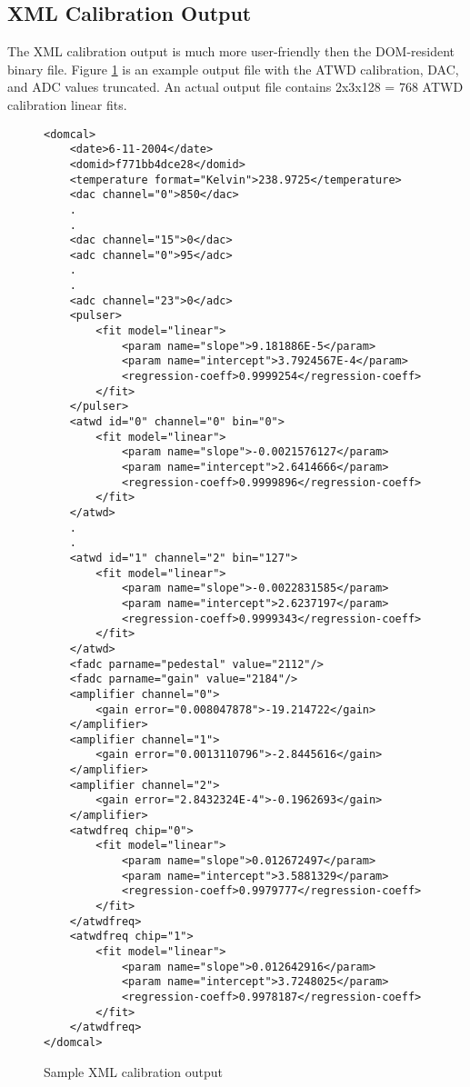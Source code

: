 \documentclass[10pt]{article}
\begin{document}
\subsection{XML Calibration Output}

The XML calibration output is much more user-friendly then the DOM-resident binary
file.  Figure \ref{fig:xml} is an example output file with the ATWD calibration,
DAC, and ADC values truncated.
An actual output file contains 2x3x128 = 768 ATWD calibration linear fits.

\begin{figure}
\begin{footnotesize}
\begin{verbatim}
<domcal>
    <date>6-11-2004</date>
    <domid>f771bb4dce28</domid>
    <temperature format="Kelvin">238.9725</temperature>
    <dac channel="0">850</dac>
    .
    .
    <dac channel="15">0</dac>
    <adc channel="0">95</adc>
    .
    .
    <adc channel="23">0</adc>
    <pulser>
        <fit model="linear">
            <param name="slope">9.181886E-5</param>
            <param name="intercept">3.7924567E-4</param>
            <regression-coeff>0.9999254</regression-coeff>
        </fit>
    </pulser>
    <atwd id="0" channel="0" bin="0">
        <fit model="linear">
            <param name="slope">-0.0021576127</param>
            <param name="intercept">2.6414666</param>
            <regression-coeff>0.9999896</regression-coeff>
        </fit>
    </atwd>
    .
    .
    <atwd id="1" channel="2" bin="127">
        <fit model="linear">
            <param name="slope">-0.0022831585</param>
            <param name="intercept">2.6237197</param>
            <regression-coeff>0.9999343</regression-coeff>
        </fit>
    </atwd>
    <fadc parname="pedestal" value="2112"/>
    <fadc parname="gain" value="2184"/>
    <amplifier channel="0">
        <gain error="0.008047878">-19.214722</gain>
    </amplifier>
    <amplifier channel="1">
        <gain error="0.0013110796">-2.8445616</gain>
    </amplifier>
    <amplifier channel="2">
        <gain error="2.8432324E-4">-0.1962693</gain>
    </amplifier>
    <atwdfreq chip="0">
        <fit model="linear">
            <param name="slope">0.012672497</param>
            <param name="intercept">3.5881329</param>
            <regression-coeff>0.9979777</regression-coeff>
        </fit>
    </atwdfreq>
    <atwdfreq chip="1">
        <fit model="linear">
            <param name="slope">0.012642916</param>
            <param name="intercept">3.7248025</param>
            <regression-coeff>0.9978187</regression-coeff>
        </fit>
    </atwdfreq>
</domcal>
\end{verbatim}
\end{footnotesize}
\caption{Sample XML calibration output}
\label{fig:xml}
\end{figure}
\end{document}
